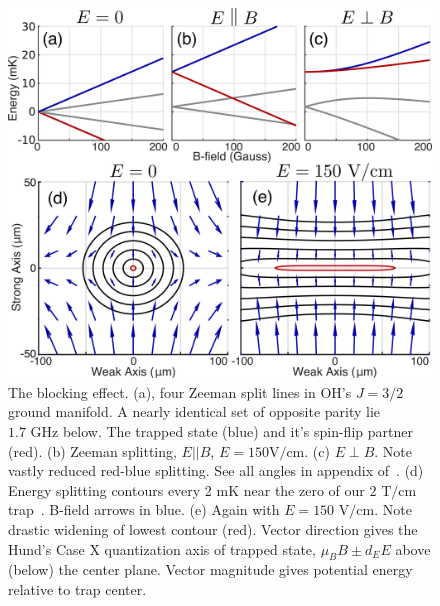 \documentclass[%
 reprint,
groupedaddress,
 amsmath,amssymb,
 aps,
prl,
]{revtex4-1}
\newcommand{\epb}{$E\!\perp\!B$}
\begin{document}

\begin{figure}[tb]
\includegraphics[width=\linewidth]{Blocking/blocking.png}%
\caption{
The blocking effect. (a), four Zeeman split lines in OH's $J=3/2$ ground manifold. A nearly identical set of opposite parity lie $1.7\text{ GHz}$ below. The trapped state (blue) and it's spin-flip partner (red). (b) Zeeman splitting, $E||B$, $E=150\text{V/cm}$. (c) \epb. Note vastly reduced red-blue splitting. See all angles in appendix of~\cite{Stuhl2013}. (d) Energy splitting contours every 2 mK near the zero of our $2\text{ T/cm}$ trap~\cite{Stuhl2012uwave}. B-field arrows in blue. (e) Again with $E=150\text{ V/cm}$. Note drastic widening of lowest contour (red). Vector direction gives the Hund's Case X quantization axis of trapped state, $\mu_BB\pm d_EE$ above (below) the center plane. Vector magnitude gives potential energy relative to trap center.
\label{fig:blocking}}
\end{figure}

\end{document}
